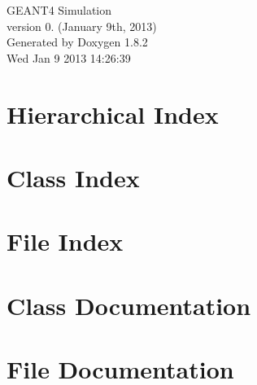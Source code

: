 \documentclass{book}
\begin{document}
\hypersetup{pageanchor=false,citecolor=blue}
\begin{titlepage}
\vspace*{7cm}
\begin{center}
{\Large G\-E\-A\-N\-T4 Simulation \\[1ex]\large version 0. (January 9th, 2013) }\\
\vspace*{1cm}
{\large Generated by Doxygen 1.8.2}\\
\vspace*{0.5cm}
{\small Wed Jan 9 2013 14:26:39}\\
\end{center}
\end{titlepage}
\clearemptydoublepage
{}
\tableofcontents
\clearemptydoublepage
{}
\hypersetup{pageanchor=true,citecolor=blue}
\chapter{Hierarchical Index}

\chapter{Class Index}

\chapter{File Index}

\chapter{Class Documentation}












\chapter{File Documentation}




























\printindex
\end{document}

